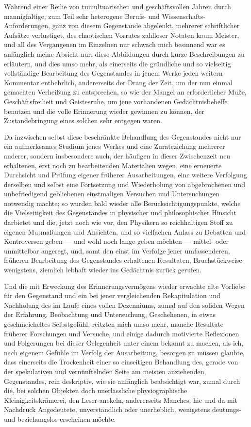 \documentclass[a4paper, 11pt, oneside, german]{article}
\begin{document}
Während einer Reihe von tumultuarischen und geschäftsvollen Jahren durch mannigfaltige, zum Teil sehr heterogene Berufs- und Wissenschafts-Anforderungen, ganz von diesem Gegenstande abgelenkt, mehrerer schriftlicher Aufsätze verlustiget, des chaotischen Vorrates zahlloser Notaten kaum Meister, und all des Vergangenen im Einzelnen nur schwach mich besinnend war es anfänglich meine Absicht nur, diese Abbildungen durch kurze Beschreibungen zu erläutern, und dies umso mehr, als einerseits die gründliche und so vielseitig vollständige Bearbeitung des Gegenstandes in jenem Werke jeden weitern Kommentar entbehrlich, andererseits der Drang der Zeit, um der nun einmal gemachten Verheißung zu entsprechen, so wie der Mangel an erforderlicher Muße, Geschäftsfreiheit und Geistesruhe, um jene vorhandenen Gedächtnisbehelfe benutzen und die volle Erinnerung wieder gewinnen zu können, der Zustandebringung eines solchen sehr entgegen waren.

Da inzwischen selbst diese beschränkte Behandlung des Gegenstandes nicht nur ein aufmerksames Studium jenes Werkes und eine Zurateziehung mehrerer anderer, sondern insbesondere auch, der häufigen in dieser Zwischenzeit neu erhaltenen, erst noch zu bearbeitenden Materialien wegen, eine erneuerte Durchsicht und Prüfung eigener früherer Ausarbeitungen, eine weitere Verfolgung derselben und selbst eine Fortsetzung und Wiederholung von abgebrochenen und unbefriedigend gebliebenen einstmaligen Versuchen und Untersuchungen notwendig machte; so wurden bald wieder alle Berücksichtigungspunkte, welche die Vielseitigkeit des Gegenstandes in physischer und philosophischer Hinsicht darbietet und die, jetzt noch wie vor, den Physikern so reichhaltigen Stoff zu eigenen Mutmaßungen und Ansichten, und so vielfachen Anlass zu Debatten und Kontroversen geben --- und wohl noch lange geben möchten --- mittel- oder unmittelbar angeregt, und, samt den einst im Verfolge jener umfassenderen, früheren Bearbeitung des Gegenstandes erhaltenen Resultaten, Bruchstückweise wenigstens, ziemlich lebhaft wieder ins Gedächtnis zurück gerufen.

Und die mit Erweckung des Erinnerungsvermögens wieder erwachte alte Vorliebe für den Gegenstand und ein bei jener vergleichenden Rekapitulation und Nachholung des im Laufe eines vollen Dezenniums, zumal auf den soliden Wegen der Erfahrung, Beobachtung und Untersuchung, Geschehenen, in etwas geschmeicheltes Selbstgefühl, reitzten mich umso mehr, manche Resultate früherer Forschungen und Versuche, und einige dadurch motivierte Reflexionen und Folgerungen bei dieser Gelegenheit unter einem bekannt zu machen, als ich, nach eigenem Gefühle im Verfolg der Ausarbeitung, besorgen zu müssen glaubte, dass einerseits die Trockenheit einer so einseitigen Behandlung des, gerade von der spekulativen und vernünftelnden Seite am meisten anziehenden, Gegenstandes, rein deskriptiv, wie sie anfänglich beabsichtigt war, zumal durch die, bei solchen Objekten doch unerlässliche physiographische Kleinigkeitskrämerei, den Leser anekeln, andererseits Manches, hie und da mit Nachdruck Angedeutete, unverständlich oder unerheblich, wenigstens deutungs- und beziehungslos erscheinen möchte.
\end{document}
